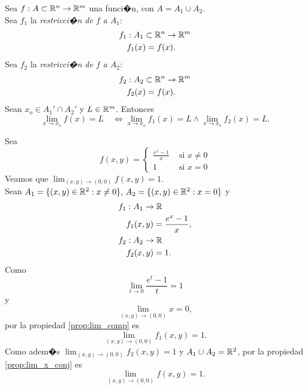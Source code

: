 \documentclass[a4paper]{scrartcl} %
\begin{document}
\begin{propiedad} \label{prop:lim_x_conj}
   Sea $f : A \subset \mathbb{R}^n \to \mathbb{R}^m$ una funci�n, con $A = A_1 \cup A_2$.\\
   Sea $f_1$ la \emph{restricci�n de $f$ a $A_1$}:
 \begin{align*}
  f_1 &: A_1 \subset \mathbb{R}^n \to \mathbb{R}^m \\
  &f_1(x) = f(x).
 \end{align*}
Sea $f_2$ la \emph{restricci�n de $f$ a $A_2$}:
 \begin{align*}
  f_2 &: A_2 \subset \mathbb{R}^n \to \mathbb{R}^m \\
  &f_2(x) = f(x).
 \end{align*}
 Sean $x_o \in A_1' \cap A_2'$ y $L \in \mathbb{R}^m$. Entonces
 \[
  \lim_{x \to x_o} f(x) = L \quad \iff 
  \lim_{x \to x_o} f_1(x) = L \wedge \lim_{x \to x_o} f_2(x) = L.
 \]
\end{propiedad}
\begin{exmp}
\mbox{}

 Sea 
  \[
   f(x,y) = 
     \begin{cases}
        \frac{e^x - 1}{x}  & \text{ si } x \ne 0  \\
         1                 & \text{ si } x = 0
     \end{cases}
  \]
 Veamos que $\lim_{(x,y) \to (0,0)} f(x,y) = 1$.\\
 Sean $A_1 = \{ (x,y) \in \mathbb{R}^2 : x \ne 0\}, \, A_2 = \{ (x,y) \in \mathbb{R}^2 : x = 0\}$ y 
 \begin{align*}
  f_1 &: A_1 \to \mathbb{R} \\
  &f_1(x,y) = \frac{e^x - 1}{x}, \\
  f_2 &: A_2 \to \mathbb{R} \\
  &f_2(x,y) = 1.
  \end{align*}
 Como 
 \[
    \lim_{t \to 0} \frac{e^t - 1}{t} = 1
 \]
 y 
 \[
    \lim_{(x,y) \to (0,0)} x = 0,
 \]
 por la propiedad \eqref{prop:lim_comp} es 
 \[
    \lim_{(x,y) \to (0,0)} f_1(x,y) = 1.
 \]
Como adem�s $\lim_{(x,y) \to (0,0)} f_2(x,y) = 1$ y $A_1 \cup A_2 = \mathbb{R}^2$, por la propiedad \eqref{prop:lim_x_conj} es
 \[
  \lim_{(x,y) \to (0,0)} f(x,y) = 1.
 \]
\end{exmp}
\end{document}
